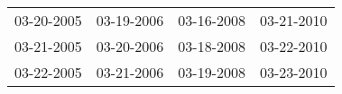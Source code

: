\begin{supertabular}{llll}
 03-20-2005 &  03-19-2006 &  03-16-2008 &  03-21-2010 \\
 03-21-2005 &  03-20-2006 &  03-18-2008 &  03-22-2010 \\
 03-22-2005 &  03-21-2006 &  03-19-2008 &  03-23-2010 \\
\end{supertabular}
